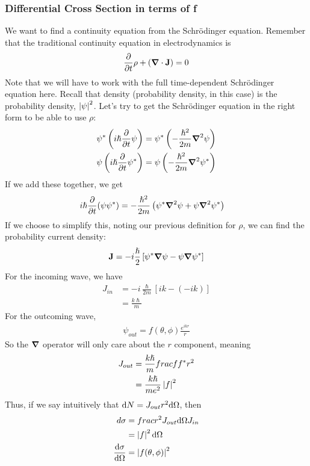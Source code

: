 \documentclass[a4paper]{article}
\begin{document}
\subsubsection{Differential Cross Section in terms of f}
We want to find a continuity equation from the Schr\"odinger equation. Remember
that the traditional continuity equation in electrodynamics is
\[
	\pd{t}\rho + (\del\cdot\vec{J}) = 0
\]
Note that we will have to work with the full time-dependent Schr\"odinger
equation here. Recall that density (probability density, in this case) is the
probability density, $\left\lvert \psi\right\rvert^2$. Let's try to get the Schr\"odinger
equation in the right form to be able to use $\rho$:
\begin{align*}
	\psi^{\ast}\left(i\hslash\pd{t}\psi\right) &=
	\psi^{\ast}\left(-\frac{\hslash^2}{2m} \del^2\psi \right)\\
	\psi\left(i\hslash\pd{t}\psi^\ast\right) &=
	\psi\left(-\frac{\hslash^2}{2m} \del^2\psi^\ast \right)\\
\end{align*}
If we add these together, we get
\begin{align*}
	i\hslash\pd{t}(\psi\psi^\ast) &= -\frac{\hslash^2}{2m}\left(
	\psi^\ast\del^2\psi + \psi\del^2\psi^\ast\right)
\end{align*}
If we choose to simplify this, noting our previous definition for $\rho$, we
can find the probability current density:
\[
	\boldsymbol{\mathbf{J}} = -i\frac{\hslash}{2}\left[
		\psi^\ast\boldsymbol{\mathbf{\nabla}}\psi - \psi\boldsymbol{\mathbf{\nabla}}\psi^\ast
	\right]
\]
For the incoming wave, we have
\begin{align*}
	J_{in} &= -i\frac{\hslash}{2m}[ik-(-ik)]\\
	&= \frac{k\hslash}{m}
\end{align*}
For the outcoming wave,
\begin{align*}
	\psi_{out} = f(\theta,\phi)\frac{e^{ikr}}{r}
\end{align*}
So the $\boldsymbol{\mathbf{\nabla}}$ operator will only care about the $r$ component, meaning
\begin{align*}
	J_{out} &= \frac{k\hslash}{m}frac{f f^\ast}{r^2}\\
	&= \frac{k\hslash}{me^2}\left\lvert f\right\rvert^2
\end{align*}
Thus, if we say intuitively that $\mathrm{d} N = J_{out} r^2\mathrm{d}\Omega$, then
\begin{align*}
	d\sigma &= frac{r^2J_{out}\mathrm{d}\Omega}{J_{in}}\\
		&= \left\lvert f\right\rvert^2\mathrm{d}\Omega\\
	\frac{\mathrm{d} \sigma}{\mathrm{d} \Omega} &= \left\lvert f(\theta,\phi)\right\rvert^2
\end{align*}
\end{document}
